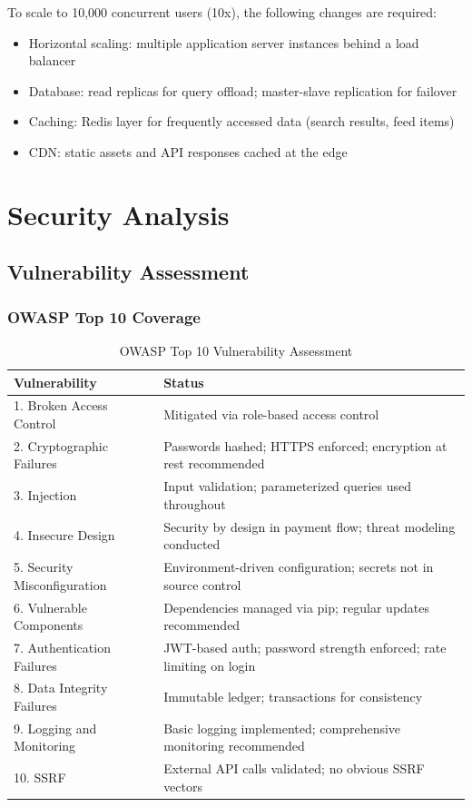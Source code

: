 \documentclass[12pt, a4paper, twoside, openright]{report}
\begin{document}
To scale to 10,000 concurrent users (10x), the following changes are required:

\begin{itemize}
    \item Horizontal scaling: multiple application server instances behind a load balancer
    \item Database: read replicas for query offload; master-slave replication for failover
    \item Caching: Redis layer for frequently accessed data (search results, feed items)
    \item CDN: static assets and API responses cached at the edge
\end{itemize}

\section{Security Analysis}

\subsection{Vulnerability Assessment}

\subsubsection{OWASP Top 10 Coverage}

\begin{table}[H]
    \centering
    \begin{tabularx}{\textwidth}{|l|l|}
    \hline
    \textbf{Vulnerability} & \textbf{Status} \\
    \hline
    1. Broken Access Control & Mitigated via role-based access control \\
    \hline
    2. Cryptographic Failures & Passwords hashed; HTTPS enforced; encryption at rest recommended \\
    \hline
    3. Injection & Input validation; parameterized queries used throughout \\
    \hline
    4. Insecure Design & Security by design in payment flow; threat modeling conducted \\
    \hline
    5. Security Misconfiguration & Environment-driven configuration; secrets not in source control \\
    \hline
    6. Vulnerable Components & Dependencies managed via pip; regular updates recommended \\
    \hline
    7. Authentication Failures & JWT-based auth; password strength enforced; rate limiting on login \\
    \hline
    8. Data Integrity Failures & Immutable ledger; transactions for consistency \\
    \hline
    9. Logging and Monitoring & Basic logging implemented; comprehensive monitoring recommended \\
    \hline
    10. SSRF & External API calls validated; no obvious SSRF vectors \\
    \hline
    \end{tabularx}
    \caption{OWASP Top 10 Vulnerability Assessment}
\end{table}
\end{document}
